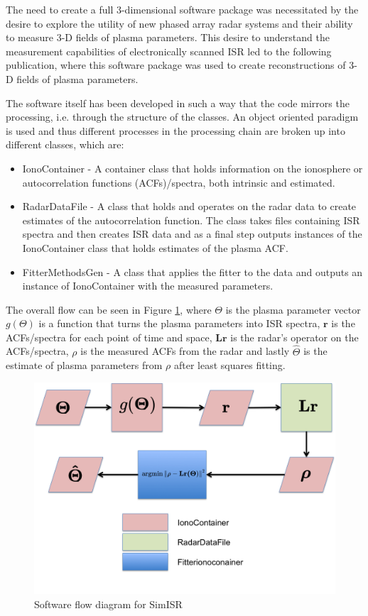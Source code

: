 The need to create a full 3-dimensional software package was necessitated by the desire to explore the utility of new phased array radar systems and their ability to measure 3-D fields of plasma parameters. This desire to understand the measurement capabilities of electronically scanned ISR led to the following publication, \citet{RDS:RDS20236} where this software package was used to create reconstructions of 3-D fields of plasma parameters.

The software itself has been developed in such a way that the code mirrors the processing, i.e. through the structure of the classes. An object oriented paradigm is used and thus different processes in the processing chain are broken up into different classes, which are: 

\begin{itemize} 
\item IonoContainer - A container class that holds information on the ionosphere or autocorrelation functions (ACFs)/spectra, both intrinsic and estimated.

\item RadarDataFile - A class that holds and operates on the radar data to create estimates of the autocorrelation function. The class takes files containing ISR spectra and then creates ISR data and as a final step outputs instances of the IonoContainer class that holds estimates of the plasma ACF.

\item FitterMethodsGen - A class that applies the fitter to the data and outputs an instance of IonoContainer with the measured parameters. 
\end{itemize}

The overall flow can be seen in Figure \ref{fig:swflow}, where  $\Theta$ is the plasma parameter vector $ g(\Theta)$ is a function that turns the plasma parameters into ISR spectra, $ \mathbf{r}$ is the ACFs/spectra for each point of time and space, $ \mathbf{Lr}$ is the radar's operator on the ACFs/spectra, $ \rho$ is the measured ACFs from the radar and lastly $ \hat{\Theta}$ is the estimate of plasma parameters from $ \rho$ after least squares fitting.

\begin{figure}[h!]
\centering
\includegraphics[width=5.0in]{softwareflowandmath}
\caption{Software flow diagram for SimISR}
\label{fig:swflow}
\end{figure}


